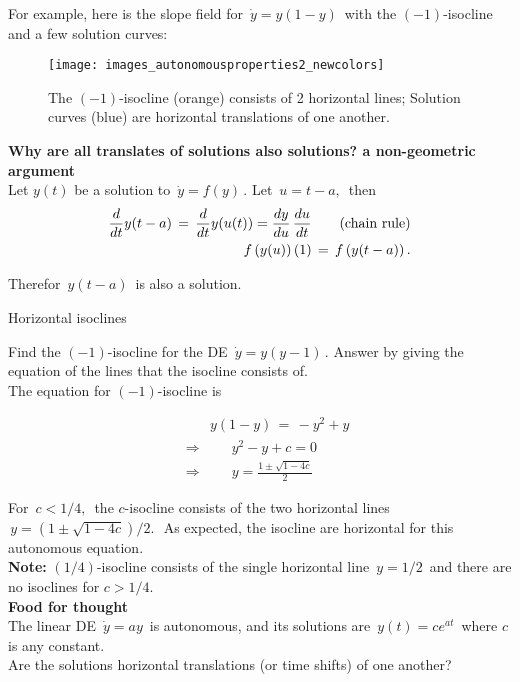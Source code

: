For example, here is the slope field for $\, \dot{y}=y(1-y)\,$ with the $(-1)$-isocline
and a few solution curves:

\begin{figure}[ht!]
  \centering
  \texttt{[image: images\_autonomousproperties2\_newcolors]}
  \caption{The $(−1)$-isocline (orange) consists of 2 horizontal lines;
Solution curves (blue) are horizontal translations of one another.}
\end{figure}

\textbf{Why are all translates of solutions also solutions? a non-geometric argument} \\

Let $y(t)$ be a solution to $\, \dot y = f(y) \,$.
Let $\, u = t - a, \,$ then
\begin{align*}
  \displaystyle  \displaystyle \frac{d}{dt} y(t-a)\, =\, \frac{d}{dt}y(u(t))
  \displaystyle = 
  \displaystyle \frac{dy}{du}\, \frac{du}{dt} \qquad (\text {chain rule}) \\
  \displaystyle \, f\left(y(u)\right) (1)\, =\, f\left(y(t-a)\right).
\end{align*}

Therefor $\, y(t -a)\,$ is also a solution. 


\begin{exercise}
  Horizontal isoclines
\end{exercise}

Find the $(-1)$-isocline for the DE $\, \dot y = y(y-1)\,$.
Answer by giving the equation of the lines that the isocline consists of.\\

The equation for $(-1)$-isocline is

\begin{align*}
  & \qquad \displaystyle y(1-y)\, =\, -y^2+y \\
  & \Rightarrow \qquad y^2 - y + c = 0 \\
  & \Rightarrow \qquad y = \frac{1 \pm \sqrt{1 - 4c}}{2}
\end{align*}

For $\, c<1/4,\,$ the $c$-isocline consists of the two horizontal lines
$\, y= (1\pm \sqrt {1-4c})/2.\, \,$
As expected, the isocline are horizontal for this autonomous equation. \\
\textbf{Note:} $(1/4)$-isocline consists of the single horizontal line
$\, y=1/2\,$ and there are no isoclines for
$c>1/4$. \\

\textbf{\color{orange}Food for thought} \\
The linear DE $\, \dot{y}=ay\,$ is autonomous, and its solutions are
$\, y(t) = ce^{at}\,$ where $c$ is any constant.\\
Are the solutions horizontal translations (or time shifts) of one another?

